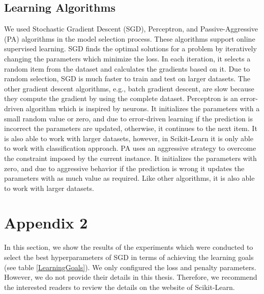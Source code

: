 \documentclass[a4paper,12pt]{article}
\begin{document}
\subsection{Learning Algorithms} \label{LearningAlgorithms}
We used Stochastic Gradient Descent (SGD), Perceptron, and Passive-Aggressive (PA) algorithms in the model selection process. These algorithms support online supervised learning. SGD \cite{HOMLWSLATF-2017} finds the optimal solutions for a problem by iteratively changing the parameters which minimize the loss. In each iteration, it selects a random item from the dataset and calculates the gradients based on it. Due to random selection, SGD is much faster to train and test on larger datasets. The other gradient descent algorithms, e.g., batch gradient descent, are slow because they compute the gradient by using the complete dataset. Perceptron \cite{MMLWSL-2014} is an error-driven algorithm which is inspired by neurons. It initializes the parameters with a small random value or zero, and due to error-driven learning if the prediction is incorrect the parameters are updated, otherwise, it continues to the next item. It is also able to work with larger datasets, however, in Scikit-Learn it is only able to work with classification approach. PA \cite{OPAA-2006} uses an aggressive strategy to overcome the constraint imposed by the current instance. It initializes the parameters with zero, and due to aggressive behavior if the prediction is wrong it updates the parameters with as much value as required. Like other algorithms, it is also able to work with larger datasets.
\section{Appendix 2}
In this section, we show the results of the experiments which were conducted to select the best hyperparameters of SGD in terms of achieving the learning goals (see table \ref{LearningGoals}). We only configured the loss and penalty parameters. However, we do not provide their details in this thesis. Therefore, we recommend the interested readers to review the details on the website of Scikit-Learn.
\end{document}
